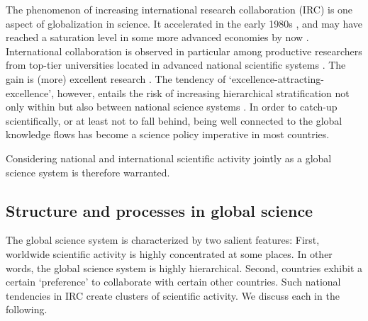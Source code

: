 The phenomenon of increasing international research collaboration (IRC) is one aspect of globalization in science. It accelerated in the early 1980s \citep{adams2013fourth}, and may have reached a saturation level in some more advanced economies by now \citep{ponds2009limits}. International collaboration is observed in particular among productive researchers from top-tier universities located in advanced national scientific systems \citep{pan2012world,jones2008multi}. The gain is (more) excellent research \citep{adams2013fourth,pan2012world}. The tendency of `excellence-attracting-excellence', however, entails the risk of increasing hierarchical stratification not only within but also between national science systems \citep{beaver1979studies,jones2008multi,horlings2011convergence}. In order to catch-up scientifically, or at least not to fall behind, being well connected to the global knowledge flows has become a science policy imperative in most countries. 

Considering national and international scientific activity jointly as a global science system is therefore warranted.


\subsection{Structure and processes in global science}

The global science system is characterized by two salient features: First, worldwide scientific activity is highly concentrated at some places. In other words, the global science system is highly hierarchical. Second, countries exhibit a certain `preference' to collaborate with certain other countries. Such national tendencies in IRC create clusters of scientific activity. We discuss each in the following.

